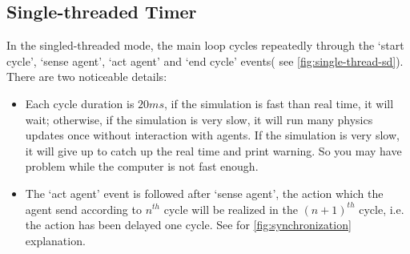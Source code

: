 \subsection{Single-threaded Timer}
In the singled-threaded mode, the main loop cycles repeatedly through
the `start cycle', `sense agent', `act agent' and `end cycle' events(
see \autoref{fig:single-thread-sd}). There are two noticeable details:
\begin{itemize}
\item Each cycle duration is $20ms$, if the simulation is fast than real
  time, it will wait; otherwise, if the simulation is very slow, it
  will run many physics updates once without interaction with agents.
  If the simulation is very slow, it will give up to catch up the real
  time and print warning. So you may have problem while the computer
  is not fast enough.
\item The `act agent' event is followed after `sense agent', the
  action which the agent send according to $n^{th}$ cycle will be
  realized in the $(n+1)^{th}$ cycle, i.e. the action has been delayed
  one cycle. See for \autoref{fig:synchronization} explanation.
\end{itemize}

